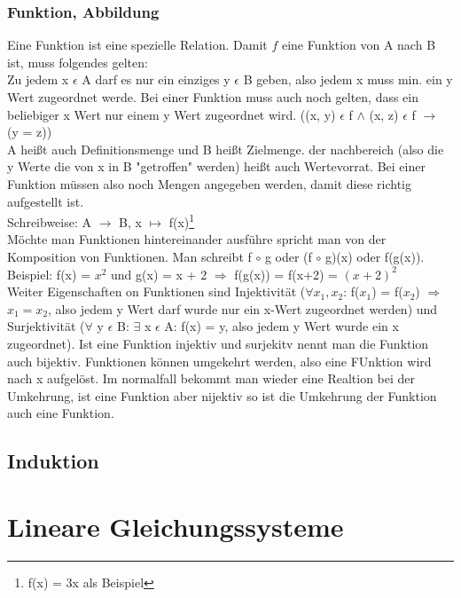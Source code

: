 \documentclass[a4paper,10pt]{scrartcl}
\begin{document}
        \subsubsection{Funktion, Abbildung}
            Eine Funktion ist eine spezielle Relation. Damit $f$ eine Funktion von A nach B ist, muss folgendes gelten:\\
            Zu jedem x $\epsilon$ A darf es nur ein einziges y $\epsilon$ B geben, also jedem x muss min. ein y Wert zugeordnet werde.
            Bei einer Funktion muss auch noch gelten, dass ein beliebiger x Wert nur einem y Wert zugeordnet wird. ((x, y) $\epsilon$ f $\wedge$ (x, z) $\epsilon$ f $\rightarrow$ (y = z)) \\
            A heißt auch Definitionsmenge und B heißt Zielmenge. der nachbereich (also die y Werte die von x in B "getroffen" werden) heißt auch Wertevorrat. Bei einer Funktion müssen also noch 
            Mengen angegeben werden, damit diese richtig aufgestellt ist.  \\
            Schreibweise: A $\rightarrow$ B, x $\mapsto$ f(x)\footnote{f(x) = 3x als Beispiel } \\
            Möchte man Funktionen hintereinander ausführe spricht man von der Komposition von Funktionen. Man schreibt f $\circ$ g oder (f $\circ$ g)(x) oder f(g(x)).
            \\ Beispiel: f(x) = $x^2$ und g(x) = x + 2 $\Rightarrow$ f(g(x)) = f(x+2) = $(x + 2)^2$ \\
            Weiter Eigenschaften on Funktionen sind Injektivität ($\forall x_1,x_2$: f($x_1$) = f($x_2$) $\Rightarrow$ $x_1 = x_2$, also jedem y Wert darf wurde nur ein x-Wert zugeordnet werden)
            und Surjektivität ($\forall$ y $\epsilon$ B: $\exists$ x $\epsilon$ A: f(x) = y, also jedem y Wert wurde ein x zugeordnet). Ist eine Funktion injektiv und surjekitv nennt man
            die Funktion auch bijektiv. Funktionen können umgekehrt werden, also eine FUnktion wird nach x aufgelöst. Im normalfall bekommt man wieder eine Realtion bei der Umkehrung, ist eine Funktion 
            aber nijektiv so ist die Umkehrung der Funktion auch eine Funktion.
        \subsection{Induktion}
  

    \section{Lineare Gleichungssysteme}
\end{document}
